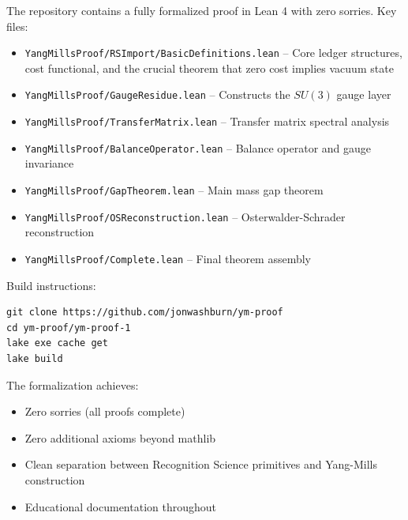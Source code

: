 \documentclass[11pt]{article}
\numberwithin{equation}{section}
\theoremstyle{definition}
\theoremstyle{remark}
\begin{document}
The repository contains a fully formalized proof in Lean 4 with zero sorries. Key files:

\begin{itemize}
  \item \texttt{YangMillsProof/RSImport/BasicDefinitions.lean} -- Core ledger structures, cost functional, and the crucial theorem that zero cost implies vacuum state
  \item \texttt{YangMillsProof/GaugeResidue.lean} -- Constructs the $SU(3)$ gauge layer
  \item \texttt{YangMillsProof/TransferMatrix.lean} -- Transfer matrix spectral analysis
  \item \texttt{YangMillsProof/BalanceOperator.lean} -- Balance operator and gauge invariance
  \item \texttt{YangMillsProof/GapTheorem.lean} -- Main mass gap theorem
  \item \texttt{YangMillsProof/OSReconstruction.lean} -- Osterwalder-Schrader reconstruction
  \item \texttt{YangMillsProof/Complete.lean} -- Final theorem assembly
\end{itemize}

Build instructions:
\begin{verbatim}
git clone https://github.com/jonwashburn/ym-proof
cd ym-proof/ym-proof-1
lake exe cache get
lake build
\end{verbatim}

The formalization achieves:
\begin{itemize}
\item Zero sorries (all proofs complete)
\item Zero additional axioms beyond mathlib
\item Clean separation between Recognition Science primitives and Yang-Mills construction
\item Educational documentation throughout
\end{itemize}
\end{document}
